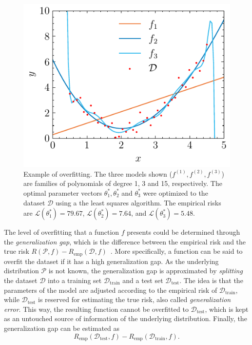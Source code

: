 \begin{figure}[h]
    \centering
    \includegraphics{pictures/overfitting.pdf}
    \caption{Example of overfitting. The three models shown ($f^{(1)},f^{(2)},f^{(3)}$) are families of polynomials of degree 1, 3 and 15, respectively. The optimal parameter vectors $\theta_1^*,\theta_2^*$ and $\theta_3^*$ were optimized to the dataset $\mathcal{D}$ using a the least squares algorithm. The empirical risks are $\mathcal{L}(\theta_1^*)=79.67$, $\mathcal{L}(\theta_2^*)=7.64$, and $\mathcal{L}(\theta_3^*)=5.48$.}
    \label{fig:overfitting-example}
\end{figure}

The level of overfitting that a function $f$ presents could be determined through the \emph{generalization gap}, which is the difference between the empirical risk and the true risk $R(\mathcal{P},f) - R_\textrm{emp}(\mathcal{D},f)$~\cite{murphyMachineLearningProbabilistic2013}.
More specifically, a function can be said to overfit the dataset if it has a high generalization gap.
As the underlying distribution $\mathcal{P}$ is not known, the generalization gap is approximated by \emph{splitting} the dataset $\mathcal{D}$ into a training set $\mathcal{D}_\textrm{train}$ and a test set $\mathcal{D}_\textrm{test}$.
The idea is that the parameters of the model are adjusted according to the empirical risk of $\mathcal{D}_\textrm{train}$, while $\mathcal{D}_\textrm{test}$ is reserved for estimating the true risk, also called \emph{generalization error}.
This way, the resulting function cannot be overfitted to $\mathcal{D}_\textrm{test}$, which is kept as an untouched source of information of the underlying distribution.
Finally, the generalization gap can be estimated as  \[
    R_\textrm{emp}(\mathcal{D}_\textrm{test},f) - R_\textrm{emp}(\mathcal{D}_\textrm{train},f)
.\] 

